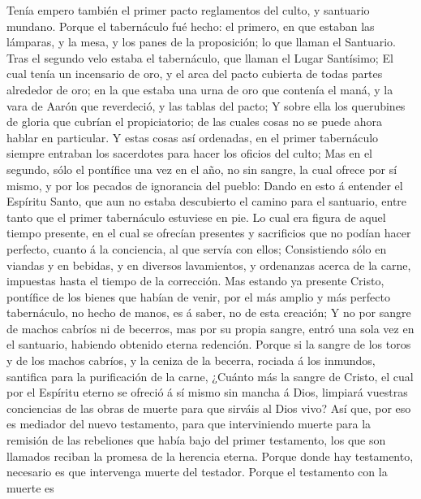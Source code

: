  Tenía empero también el primer pacto reglamentos del
culto, y santuario mundano.  Porque el tabernáculo fué
hecho: el primero, en que estaban las lámparas, y la mesa, y los panes
de la proposición; lo que llaman el Santuario.  Tras el
segundo velo estaba el tabernáculo, que llaman el Lugar Santísimo;
 El cual tenía un incensario de oro, y el arca del pacto
cubierta de todas partes alrededor de oro; en la que estaba una urna de
oro que contenía el maná, y la vara de Aarón que reverdeció, y las
tablas del pacto;  Y sobre ella los querubines de gloria
que cubrían el propiciatorio; de las cuales cosas no se puede ahora
hablar en particular.  Y estas cosas así ordenadas, en el
primer tabernáculo siempre entraban los sacerdotes para hacer los
oficios del culto;  Mas en el segundo, sólo el pontífice
una vez en el año, no sin sangre, la cual ofrece por sí mismo, y por los
pecados de ignorancia del pueblo:  Dando en esto á
entender el Espíritu Santo, que aun no estaba descubierto el camino para
el santuario, entre tanto que el primer tabernáculo estuviese en pie.
 Lo cual era figura de aquel tiempo presente, en el cual
se ofrecían presentes y sacrificios que no podían hacer perfecto, cuanto
á la conciencia, al que servía con ellos;  Consistiendo
sólo en viandas y en bebidas, y en diversos lavamientos, y ordenanzas
acerca de la carne, impuestas hasta el tiempo de la corrección.
 Mas estando ya presente Cristo, pontífice de los bienes
que habían de venir, por el más amplio y más perfecto tabernáculo, no
hecho de manos, es á saber, no de esta creación;  Y no
por sangre de machos cabríos ni de becerros, mas por su propia sangre,
entró una sola vez en el santuario, habiendo obtenido eterna redención.
 Porque si la sangre de los toros y de los machos
cabríos, y la ceniza de la becerra, rociada á los inmundos, santifica
para la purificación de la carne,  ¿Cuánto más la sangre
de Cristo, el cual por el Espíritu eterno se ofreció á sí mismo sin
mancha á Dios, limpiará vuestras conciencias de las obras de muerte para
que sirváis al Dios vivo?  Así que, por eso es mediador
del nuevo testamento, para que interviniendo muerte para la remisión de
las rebeliones que había bajo del primer testamento, los que son
llamados reciban la promesa de la herencia eterna. 
Porque donde hay testamento, necesario es que intervenga muerte del
testador.  Porque el testamento con la muerte es
